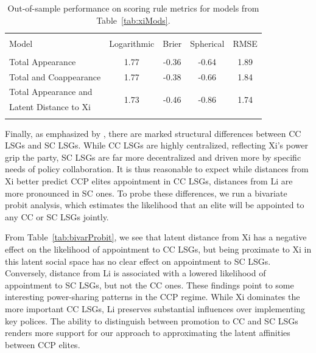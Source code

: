 \documentclass[11pt,english]{article}
\begin{document}
\begin{flushleft}
\begin{table}[ht]
\centering
\begin{small}
\caption{Out-of-sample performance on scoring rule metrics for models from Table~\ref{tab:xiMods}.}
\label{tab:xiModsPerf}
  \begin{tabular}{lcccc}
  \\[-1.8ex]\hline
  \hline \\[-1.8ex]
  Model & Logarithmic & Brier & Spherical & RMSE\\    \hline \\[-1.8ex]
Total Appearance & 1.77 & -0.36 & -0.64 & 1.89 \\
Total and Coappearance & 1.77 & -0.38 & -0.66 & 1.84 \\
Total Appearance and  & \multirow{2}{*}{1.73} & \multirow{2}{*}{-0.46} & \multirow{2}{*}{-0.86} & \multirow{2}{*}{1.74} \\
  \;\;\; Latent Distance to Xi &  &  &  &  \\
    \hline
 \hline \\[-1.8ex]
\end{tabular}
\end{small}
\end{table}

Finally, as emphasized by \citet{Huhe2018a}, there are marked structural differences between CC LSGs and SC LSGs. While CC LSGs are highly centralized, reflecting Xi's power grip the party, SC LSGs are far more decentralized and driven more by specific needs of policy collaboration. It is thus reasonable to expect while distances from Xi better predict CCP elites appointment in CC LSGs, distances from Li are more pronounced in SC ones. To probe these differences, we run a bivariate probit analysis, which estimates the likelihood that an elite will be appointed to any CC or SC LSGs jointly.

From Table~\ref{tab:bivarProbit}, we see that latent distance from Xi has a negative effect on the likelihood of appointment to CC LSGs, but being proximate to Xi in this latent social space has no clear effect on appointment to SC LSGs. Conversely, distance from Li is associated with a lowered likelihood of appointment to SC LSGs, but not the CC ones. These findings point to some interesting power-sharing patterns in the CCP regime. While Xi dominates the more important CC LSGs, Li preserves substantial influences over implementing key polices. The ability to distinguish between promotion to CC and SC LSGs renders more support for our approach to approximating the latent affinities between CCP elites.


\end{flushleft}
\end{document}
